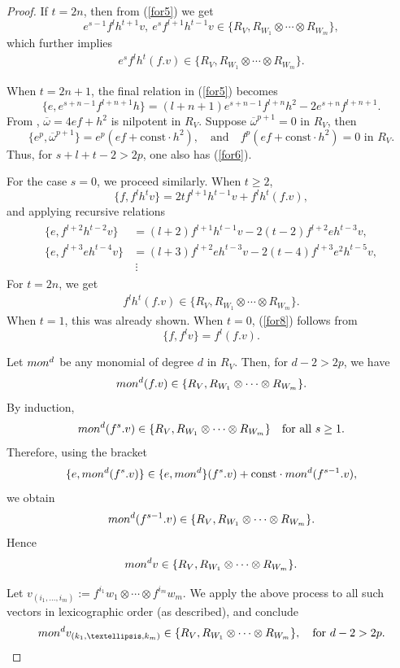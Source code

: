 \documentclass[9pt]{amsart}
\begin{document}
\begin{proof}
If $t = 2n$, then from (\ref{for5}) we get
\[
e^{s-1} f^l h^{t+1} v,\ e^s f^{l+1} h^{t-1} v \in \{R_V, R_{W_1} \otimes \cdots \otimes R_{W_m}\},
\]
which further implies
\begin{align}\label{for6}
e^s f^l h^t (f.v) \in \{R_V, R_{W_1} \otimes \cdots \otimes R_{W_m}\}.
\end{align}

When $t=2n+1$, the final relation in (\ref{for5}) becomes
\[
\{e, e^{s+n-1} f^{l+n+1} h\} = (l+n+1) e^{s+n-1} f^{l+n} h^2 - 2e^{s+n} f^{l+n+1}.
\]
From \cite[Proposition 3.3]{arakawa2018quasi}, $\overline{\omega} = 4ef + h^2$ is nilpotent in $R_V$. Suppose $\overline{\omega}^{p+1} = 0$ in $R_V$, then
\[
\{e^p, \overline{\omega}^{p+1}\} = e^p (ef + \text{const} \cdot h^2),
\quad \text{and} \quad
f^p (ef + \text{const} \cdot h^2) = 0 \text{ in } R_V.
\]
Thus, for $s + l + t - 2 > 2p$, one also has (\ref{for6}).

For the case $s = 0$, we proceed similarly. When $t \geq 2$,
\[
\{f, f^l h^t v\} = 2t f^{l+1} h^{t-1} v + f^l h^t(f.v),
\]
and applying recursive relations
\begin{align}\label{for7}
\begin{split}
\{e, f^{l+2} h^{t-2} v\} &= (l+2) f^{l+1} h^{t-1} v - 2(t-2) f^{l+2} e h^{t-3} v, \\
\{e, f^{l+3} e h^{t-4} v\} &= (l+3) f^{l+2} e h^{t-3} v - 2(t-4) f^{l+3} e^2 h^{t-5} v, \\
&\ \vdots
\end{split}
\end{align}
For $t = 2n$, we get
\begin{align}\label{for8}
f^l h^t (f.v) \in \{R_V, R_{W_1} \otimes \cdots \otimes R_{W_m}\}.
\end{align}
When $t=1$, this was already shown. When $t=0$, (\ref{for8}) follows from
\[
\{f, f^l v\} = f^l(f.v).
\]

Let ${\rm mon}^d$ be any monomial of degree $d$ in $R_V$. Then, for $d - 2 > 2p$, we have
\[
{\rm mon}^d(f.v) \in \{R_V, R_{W_1} \otimes \cdots \otimes R_{W_m}\}.
\]
By induction,
\[
{\rm mon}^d(f^s.v) \in \{R_V, R_{W_1} \otimes \cdots \otimes R_{W_m}\} \quad \text{for all } s \geq 1.
\]
Therefore, using the bracket
\[
\{e, {\rm mon}^d(f^s.v)\} \in \{e, {\rm mon}^d\}(f^s.v) + \text{const} \cdot {\rm mon}^d(f^{s-1}.v),
\]
we obtain
\[
{\rm mon}^d(f^{s-1}.v) \in \{R_V, R_{W_1} \otimes \cdots \otimes R_{W_m}\}.
\]
Hence
\[
{\rm mon}^d v \in \{R_V, R_{W_1} \otimes \cdots \otimes R_{W_m}\}.
\]

Let $v_{(i_1, \ldots, i_m)} := f^{i_1} w_1 \otimes \cdots \otimes f^{i_m} w_m$. We apply the above process to all such vectors in lexicographic order (as described), and conclude
\[
{\rm mon}^d v_{(k_1, \ldots, k_m)} \in \{R_V, R_{W_1} \otimes \cdots \otimes R_{W_m}\}, \quad \text{for } d - 2 > 2p.
\]


\end{proof}
\end{document}
